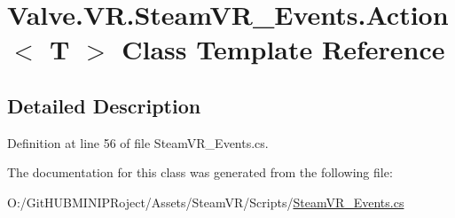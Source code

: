 \hypertarget{class_valve_1_1_v_r_1_1_steam_v_r___events_1_1_action}{}\section{Valve.\+V\+R.\+Steam\+V\+R\+\_\+\+Events.\+Action$<$ T $>$ Class Template Reference}
\label{class_valve_1_1_v_r_1_1_steam_v_r___events_1_1_action}


\subsection{Detailed Description}


Definition at line 56 of file Steam\+V\+R\+\_\+\+Events.\+cs.



The documentation for this class was generated from the following file\+:\begin{DoxyCompactItemize}
\item 
O\+:/\+Git\+H\+U\+B\+M\+I\+N\+I\+P\+Roject/\+Assets/\+Steam\+V\+R/\+Scripts/\mbox{\hyperlink{_steam_v_r___events_8cs}{Steam\+V\+R\+\_\+\+Events.\+cs}}\end{DoxyCompactItemize}
